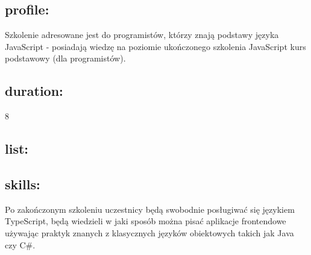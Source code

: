 \documentclass{article}[10pt]
\begin{document}
	\subsection*{profile:}
\begin{adjustwidth}{2cm}{}
	
Szkolenie adresowane jest do programistów, którzy znają podstawy języka JavaScript  - posiadają wiedzę na poziomie ukończonego szkolenia JavaScript kurs podstawowy (dla programistów).
\end{adjustwidth}
	\subsection*{duration:}
\begin{adjustwidth}{2cm}{}
	8
\end{adjustwidth}

	\subsection*{list:}
\begin{adjustwidth}{1.5cm}{}
	\begin{itemize}

























	\end{itemize}
\end{adjustwidth}

	\subsection*{skills:}
\begin{adjustwidth}{2cm}{}
	
Po zakończonym szkoleniu uczestnicy będą swobodnie posługiwać się językiem TypeScript, będą wiedzieli w jaki sposób można pisać aplikacje frontendowe używając praktyk znanych z klasycznych języków obiektowych takich jak Java czy C#.



\end{adjustwidth}
\end{document}
